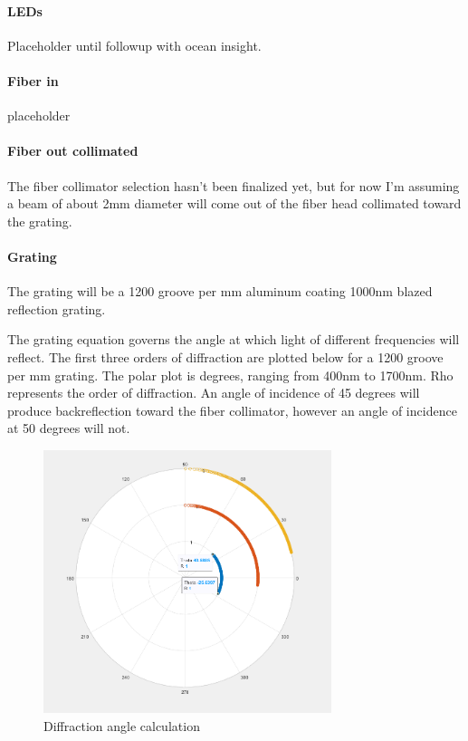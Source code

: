 \paragraph{LEDs}

Placeholder until followup with ocean insight.

\paragraph{Fiber in}

placeholder

\paragraph{Fiber out collimated}

The fiber collimator selection hasn’t been finalized yet, but for now I’m assuming a beam of about 2mm diameter will come out of the fiber head collimated toward the grating.

\paragraph{Grating}

    The grating will be a 1200 groove per mm aluminum coating 1000nm blazed reflection grating. 
 
The grating equation governs the angle at which light of different frequencies will reflect. 
The first three orders of diffraction are plotted below for a 1200 groove per mm grating. The polar plot is degrees, ranging from 400nm to 1700nm. Rho represents the order of diffraction.
An angle of incidence of 45 degrees will produce backreflection toward the fiber collimator, however an angle of incidence at 50 degrees will not.



\begin{figure}[H]
    \caption{Diffraction angle calculation}
    \centering
    \includegraphics[width=0.75\textwidth]{images/DiffractionAngleCalculator.png}
\end{figure}

